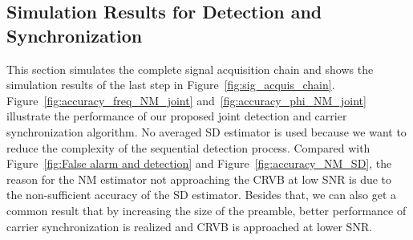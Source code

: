 \subsection{Simulation Results for Detection and Synchronization}

This section simulates the complete signal acquisition chain and shows the simulation results of the last step in Figure~\ref{fig:sig_acquis_chain}.
Figure~\ref{fig:accuracy_freq_NM_joint} and~\ref{fig:accuracy_phi_NM_joint} illustrate the performance of our proposed joint detection and 
carrier synchronization algorithm. No averaged SD estimator is used because we want to reduce the complexity of the sequential detection process.
Compared with Figure~\ref{fig:False alarm and detection} and Figure~\ref{fig:accuracy_NM_SD}, the reason for the NM estimator not approaching the CRVB at low SNR
is due to the non-sufficient accuracy of the SD estimator. 
Besides that, we can also get a common result that by increasing
the size of the preamble, better performance of carrier synchronization is realized and CRVB is approached at lower SNR.
